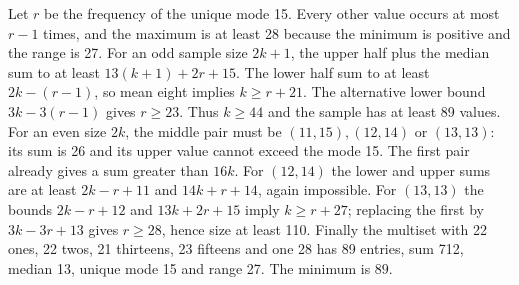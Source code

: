 Let $r$ be the frequency of the unique mode 15. Every other value occurs at most $r-1$ times, and the maximum is at least 28 because the minimum is positive and the range is 27. For an odd sample size $2k+1$, the upper half plus the median sum to at least $13(k+1)+2r+15$. The lower half sum to at least $2k-(r-1)$, so mean eight implies $k\ge r+21$. The alternative lower bound $3k-3(r-1)$ gives $r\ge23$. Thus $k\ge44$ and the sample has at least 89 values. For an even size $2k$, the middle pair must be $(11,15),(12,14)$ or $(13,13)$: its sum is 26 and its upper value cannot exceed the mode 15. The first pair already gives a sum greater than $16k$. For $(12,14)$ the lower and upper sums are at least $2k-r+11$ and $14k+r+14$, again impossible. For $(13,13)$ the bounds $2k-r+12$ and $13k+2r+15$ imply $k\ge r+27$; replacing the first by $3k-3r+13$ gives $r\ge28$, hence size at least 110. Finally the multiset with 22 ones, 22 twos, 21 thirteens, 23 fifteens and one 28 has 89 entries, sum 712, median 13, unique mode 15 and range 27. The minimum is $\boxed{89}$.
